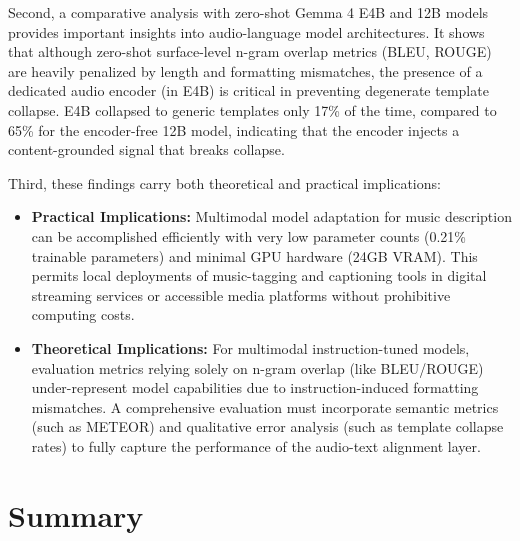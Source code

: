 \documentclass[12pt, conference, letterpaper]{IEEEtran}
\begin{document}
Second, a comparative analysis with zero-shot Gemma 4 E4B and 12B models provides important insights into audio-language model architectures. It shows that although zero-shot surface-level n-gram overlap metrics (BLEU, ROUGE) are heavily penalized by length and formatting mismatches, the presence of a dedicated audio encoder (in E4B) is critical in preventing degenerate template collapse. E4B collapsed to generic templates only 17\% of the time, compared to 65\% for the encoder-free 12B model, indicating that the encoder injects a content-grounded signal that breaks collapse.

Third, these findings carry both theoretical and practical implications:
\begin{itemize}
    \item \textbf{Practical Implications:} Multimodal model adaptation for music description can be accomplished efficiently with very low parameter counts (0.21\% trainable parameters) and minimal GPU hardware (24GB VRAM). This permits local deployments of music-tagging and captioning tools in digital streaming services or accessible media platforms without prohibitive computing costs.
    \item \textbf{Theoretical Implications:} For multimodal instruction-tuned models, evaluation metrics relying solely on n-gram overlap (like BLEU/ROUGE) under-represent model capabilities due to instruction-induced formatting mismatches. A comprehensive evaluation must incorporate semantic metrics (such as METEOR) and qualitative error analysis (such as template collapse rates) to fully capture the performance of the audio-text alignment layer.
\end{itemize}

\section{Summary}
\label{sec:summary}
\end{document}
